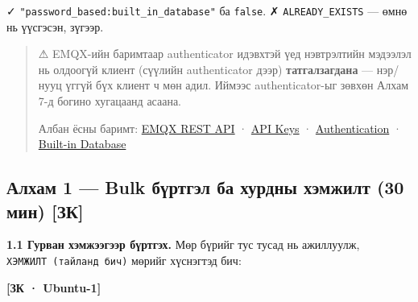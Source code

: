 ✓ \texttt{"password\_\allowbreak{}based:\allowbreak{}built\_\allowbreak{}in\_\allowbreak{}database"} ба \texttt{false}. ✗ \texttt{ALREADY\_EXISTS} --- өмнө нь үүсгэсэн, зүгээр.

\begin{quote}
⚠ EMQX-ийн баримтаар authenticator идэвхтэй үед нэвтрэлтийн мэдээлэл нь олдоогүй клиент (сүүлийн authenticator дээр) \textbf{татгалзагдана} --- нэр/нууц үггүй бүх клиент ч мөн адил. Иймээс authenticator-ыг зөвхөн Алхам 7-д богино хугацаанд асаана.

Албан ёсны баримт: \href{https://docs.emqx.com/en/emqx/v5.8/guides/api.html}{EMQX REST API} · \href{https://docs.emqx.com/en/emqx/v5.8/guides/api-keys.html}{API Keys} · \href{https://docs.emqx.com/en/emqx/v5.8/guides/access-control/authn/authn.html}{Authentication} · \href{https://docs.emqx.com/en/emqx/v5.8/guides/access-control/authn/mnesia.html}{Built-in Database}
\end{quote}

\hypertarget{ux430ux43bux445ux430ux43c-1-bulk-ux431ux4afux440ux442ux433ux44dux43b-ux431ux430-ux445ux443ux440ux434ux43dux44b-ux445ux44dux43cux436ux438ux43bux442-30-ux43cux438ux43d-ux437ux43a}{%
\subsection{Алхам 1 --- Bulk бүртгэл ба хурдны хэмжилт (30 мин) {[}ЗК{]}}\label{ux430ux43bux445ux430ux43c-1-bulk-ux431ux4afux440ux442ux433ux44dux43b-ux431ux430-ux445ux443ux440ux434ux43dux44b-ux445ux44dux43cux436ux438ux43bux442-30-ux43cux438ux43d-ux437ux43a}}

\textbf{1.1 Гурван хэмжээгээр бүртгэх.} Мөр бүрийг тус тусад нь ажиллуулж, \texttt{ХЭМЖИЛТ\ (тайланд\ бич)} мөрийг хүснэгтэд бич:

\textbf{{[}ЗК · Ubuntu-1{]}}

\begin{Shaded}
\begin{Highlighting}[]
\KeywordTok{|} 
\KeywordTok{|} 
\KeywordTok{|} 
\end{Highlighting}
\end{Shaded}

